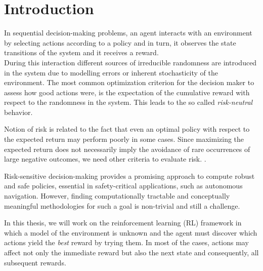 \chapter{Introduction}
\label{sec:introduction}


In sequential decision-making problems, an agent interacts with an environment by
selecting actions according to a policy 
and in turn, it observes the state transitions of the system and it receives a reward.\\
During this interaction different sources of irreducible 
randomness are introduced in the system due to modelling errors or inherent stochasticity of the environment.
The most common optimization criterion for the decision maker to assess how good actions were, 
is the expectation of the cumulative reward
with respect to the randomness in the system. This leads to the so called \textit{risk-neutral} behavior.

Notion of risk is related to the fact that even an optimal policy with respect to the 
expected return may perform poorly in some cases.
Since maximizing the expected return does not necessarily imply the avoidance
of rare occurrences of large negative outcomes,
we need other criteria to evaluate risk. \citep{Garcia2015}.

Risk-sensitive decision-making provides a promising
approach to compute robust and safe policies, essential in safety-critical applications,
such as autonomous navigation.
However, finding computationally tractable and conceptually meaningful methodologies for
such a goal is non-trivial and still a challenge.

In this thesis, we will work on the reinforcement learning (RL)
framework in which a model of the environment is unknown and the agent
must discover which actions yield the \textit{best} reward by trying them. 
In most of the cases,
actions may affect not only the immediate reward but also the next state and consequently,
all subsequent rewards.

